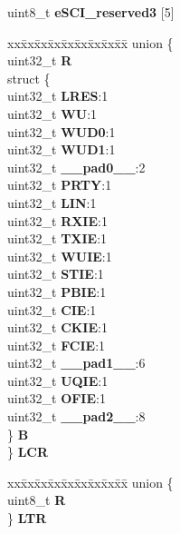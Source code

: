 \begin{DoxyCompactItemize}
\begin{tabbing}
\end{tabbing}\item 
\mbox{\label{structESCI__tag_a82d83764198d5f6aaee86af79a5009b4}} 
uint8\+\_\+t {\bfseries e\+S\+C\+I\+\_\+reserved3} \mbox{[}5\mbox{]}
\item 
\mbox{\label{structESCI__tag_aaf8670999ff128c1481a4462b94aa2e7}} 
\begin{tabbing}
xx\=xx\=xx\=xx\=xx\=xx\=xx\=xx\=xx\=\kill
union \{\\
\>uint32\_t {\bfseries R}\\
\>struct \{\\
\>\>uint32\_t {\bfseries LRES}:1\\
\>\>uint32\_t {\bfseries WU}:1\\
\>\>uint32\_t {\bfseries WUD0}:1\\
\>\>uint32\_t {\bfseries WUD1}:1\\
\>\>uint32\_t {\bfseries \_\_pad0\_\_}:2\\
\>\>uint32\_t {\bfseries PRTY}:1\\
\>\>uint32\_t {\bfseries LIN}:1\\
\>\>uint32\_t {\bfseries RXIE}:1\\
\>\>uint32\_t {\bfseries TXIE}:1\\
\>\>uint32\_t {\bfseries WUIE}:1\\
\>\>uint32\_t {\bfseries STIE}:1\\
\>\>uint32\_t {\bfseries PBIE}:1\\
\>\>uint32\_t {\bfseries CIE}:1\\
\>\>uint32\_t {\bfseries CKIE}:1\\
\>\>uint32\_t {\bfseries FCIE}:1\\
\>\>uint32\_t {\bfseries \_\_pad1\_\_}:6\\
\>\>uint32\_t {\bfseries UQIE}:1\\
\>\>uint32\_t {\bfseries OFIE}:1\\
\>\>uint32\_t {\bfseries \_\_pad2\_\_}:8\\
\>\} {\bfseries B}\\
\} {\bfseries LCR}\\

\end{tabbing}\item 
\mbox{\label{structESCI__tag_a1536c891c1b1b41cd22606b0a059d6b7}} 
\begin{tabbing}
xx\=xx\=xx\=xx\=xx\=xx\=xx\=xx\=xx\=\kill
union \{\\
\>uint8\_t {\bfseries R}\\
\} {\bfseries LTR}\\


\end{tabbing}
\end{DoxyCompactItemize}
